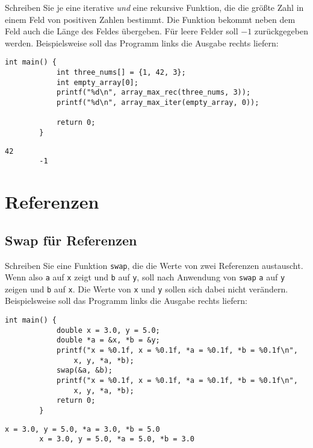 \documentclass[]{article}
\begin{document}
	Schreiben Sie je eine iterative \emph{und} eine rekursive Funktion, die die größte Zahl in einem Feld von positiven Zahlen bestimmt.
	Die Funktion bekommt neben dem Feld auch die Länge des Feldes übergeben.
	Für leere Felder soll $-1$ zurückgegeben werden.
	Beispielsweise soll das Programm links die Ausgabe rechts liefern:
	
	\begin{minipage}[t][][b]{0.6\linewidth}
	\begin{lstlisting}[gobble=4]
		int main() {
			int three_nums[] = {1, 42, 3};
			int empty_array[0];
			printf("%d\n", array_max_rec(three_nums, 3));
			printf("%d\n", array_max_iter(empty_array, 0));
			  
			return 0;
		}
	\end{lstlisting}
	\end{minipage}\qquad
	\begin{minipage}[t][][b]{0.3\linewidth}
	\begin{lstlisting}[gobble=4]
		42
		-1
	\end{lstlisting}
	\end{minipage}
	
	\clearpage

	\section{Referenzen}
	
	\subsection{Swap für Referenzen}
	
	Schreiben Sie eine Funktion \texttt{swap}, die die Werte von zwei Referenzen austauscht.
	Wenn also \texttt{a} auf \texttt{x} zeigt und \texttt{b} auf \texttt{y}, soll nach Anwendung von \texttt{swap} \texttt{a} auf \texttt{y} zeigen und \texttt{b} auf \texttt{x}.
	Die Werte von \texttt{x} und \texttt{y} sollen sich dabei nicht verändern.
	Beispielsweise soll das Programm links die Ausgabe rechts liefern:

	\begin{minipage}[t][][b]{0.6\linewidth}
	\begin{lstlisting}[gobble=4]
		int main() {    
			double x = 3.0, y = 5.0;
			double *a = &x, *b = &y;
			printf("x = %0.1f, x = %0.1f, *a = %0.1f, *b = %0.1f\n", 
				x, y, *a, *b);
			swap(&a, &b);
			printf("x = %0.1f, x = %0.1f, *a = %0.1f, *b = %0.1f\n", 
				x, y, *a, *b);
			return 0;
		}
	\end{lstlisting}
	\end{minipage}\qquad
	\begin{minipage}[t][][b]{0.35\linewidth}
	\begin{lstlisting}[gobble=4]
		x = 3.0, y = 5.0, *a = 3.0, *b = 5.0
		x = 3.0, y = 5.0, *a = 5.0, *b = 3.0
	\end{lstlisting}
	\end{minipage}
	
\end{document}
